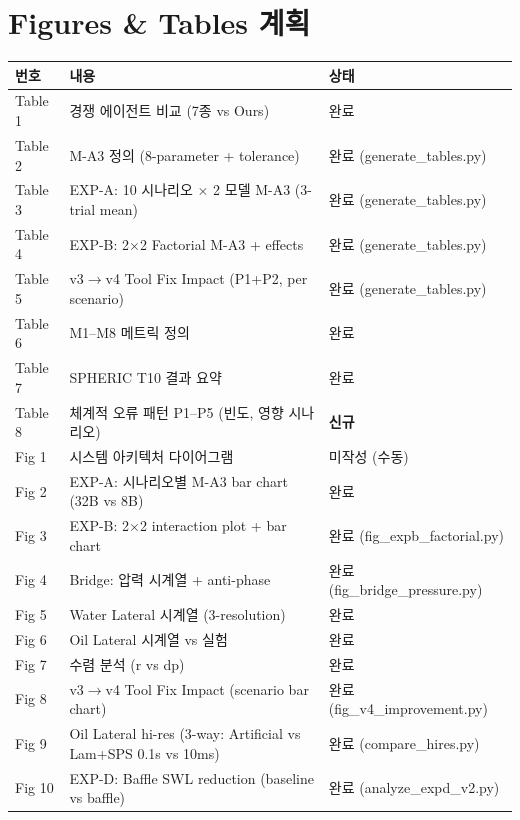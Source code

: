 \documentclass[11pt,a4paper]{article}
\begin{document}
\section{Figures \& Tables 계획}

\begin{tabular}{lll}
\toprule
\textbf{번호} & \textbf{내용} & \textbf{상태} \\
\midrule
Table 1 & 경쟁 에이전트 비교 (7종 vs Ours) & 완료 \\
Table 2 & M-A3 정의 (8-parameter + tolerance) & 완료 (generate\_tables.py) \\
Table 3 & EXP-A: 10 시나리오 $\times$ 2 모델 M-A3 (3-trial mean) & 완료 (generate\_tables.py) \\
Table 4 & EXP-B: 2$\times$2 Factorial M-A3 + effects & 완료 (generate\_tables.py) \\
Table 5 & v3$\rightarrow$v4 Tool Fix Impact (P1+P2, per scenario) & 완료 (generate\_tables.py) \\
Table 6 & M1--M8 메트릭 정의 & 완료 \\
Table 7 & SPHERIC T10 결과 요약 & 완료 \\
Table 8 & 체계적 오류 패턴 P1--P5 (빈도, 영향 시나리오) & \textbf{신규} \\
\midrule
Fig 1 & 시스템 아키텍처 다이어그램 & 미작성 (수동) \\
Fig 2 & EXP-A: 시나리오별 M-A3 bar chart (32B vs 8B) & 완료 \\
Fig 3 & EXP-B: 2$\times$2 interaction plot + bar chart & 완료 (fig\_expb\_factorial.py) \\
Fig 4 & Bridge: 압력 시계열 + anti-phase & 완료 (fig\_bridge\_pressure.py) \\
Fig 5 & Water Lateral 시계열 (3-resolution) & 완료 \\
Fig 6 & Oil Lateral 시계열 vs 실험 & 완료 \\
Fig 7 & 수렴 분석 (r vs dp) & 완료 \\
Fig 8 & v3$\rightarrow$v4 Tool Fix Impact (scenario bar chart) & 완료 (fig\_v4\_improvement.py) \\
Fig 9 & Oil Lateral hi-res (3-way: Artificial vs Lam+SPS 0.1s vs 10ms) & 완료 (compare\_hires.py) \\
Fig 10 & EXP-D: Baffle SWL reduction (baseline vs baffle) & 완료 (analyze\_expd\_v2.py) \\
\bottomrule
\end{tabular}
\end{document}
